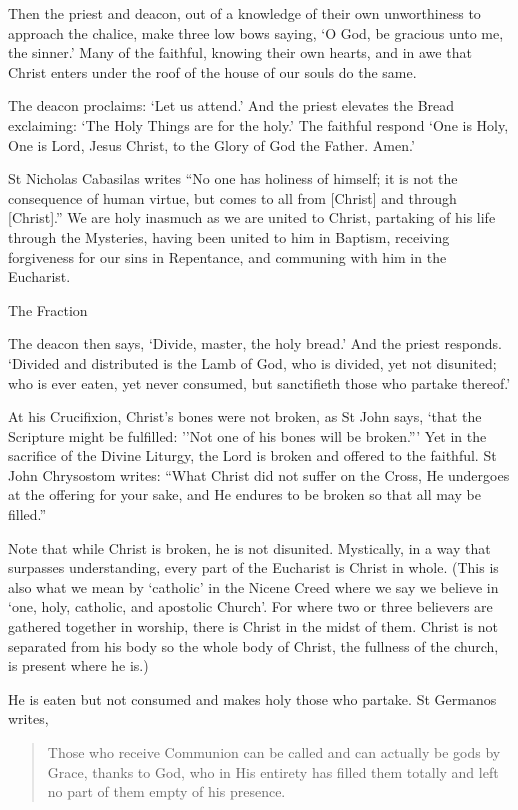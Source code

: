 \documentclass[
]{article}
\newcommand{\RL}[1]{\beginR #1\endR}
\begin{document}
Then the priest and deacon, out of a knowledge of their own unworthiness
to approach the chalice, make three low bows saying, `O God, be gracious
unto me, the sinner.' Many of the faithful, knowing their own hearts,
and in awe that Christ enters under the roof of the house of our souls
do the same.

The deacon proclaims: `Let us attend.' And the priest elevates the Bread
exclaiming: `The Holy Things are for the holy.' The faithful respond
`One is Holy, One is Lord, Jesus Christ, to the Glory of God the Father.
Amen.'

St Nicholas Cabasilas writes ``No one has holiness of himself; it is not
the consequence of human virtue, but comes to all from {[}Christ{]} and
through {[}Christ{]}.'' We are holy inasmuch as we are united to Christ,
partaking of his life through the Mysteries, having been united to him
in Baptism, receiving forgiveness for our sins in Repentance, and
communing with him in the Eucharist.

The Fraction

The deacon then says, `Divide, master, the holy bread.' And the priest
responds. `Divided and distributed is the Lamb of God, who is divided,
yet not disunited; who is ever eaten, yet never consumed, but
sanctifieth those who partake thereof.'

At his Crucifixion, Christ's bones were not broken, as St John says,
`that the Scripture might be fulfilled: \RL{''}Not one of his bones will
be broken.''' Yet in the sacrifice of the Divine Liturgy, the Lord is
broken and offered to the faithful. St John Chrysostom writes: ``What
Christ did not suffer on the Cross, He undergoes at the offering for
your sake, and He endures to be broken so that all may be filled.''

Note that while Christ is broken, he is not disunited. Mystically, in a
way that surpasses understanding, every part of the Eucharist is Christ
in whole. (This is also what we mean by `catholic' in the Nicene Creed
where we say we believe in `one, holy, catholic, and apostolic Church'.
For where two or three believers are gathered together in worship, there
is Christ in the midst of them. Christ is not separated from his body so
the whole body of Christ, the fullness of the church, is present where
he is.)

He is eaten but not consumed and makes holy those who partake. St
Germanos writes,

\begin{quote}
Those who receive Communion can be called and can actually be gods by
Grace, thanks to God, who in His entirety has filled them totally and
left no part of them empty of his presence.
\end{quote}
\end{document}
